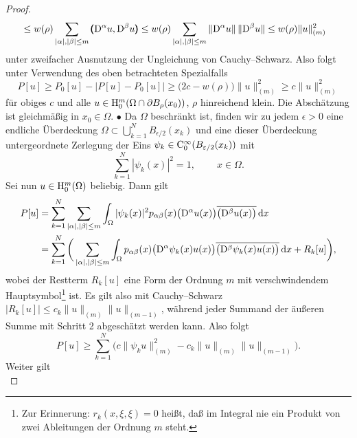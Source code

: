\begin{proof}
\begin{equation}
\begin{split}
	&\le w(\rho) \sum\limits_{|\alpha|,|\beta| \le m} \pmb(\mathrm D^\alpha u,\mathrm D^\beta u\pmb) \le  w(\rho) \sum\limits_{|\alpha|,|\beta| \le m}\|\mathrm D^\alpha u\|\, \|\mathrm D^\beta u\| \le
	 w(\rho) \|u\|_{(m)}^2
\end{split}
\end{equation}
unter zweifacher Ausnutzung der Ungleichung von Cauchy--Schwarz. Also folgt unter Verwendung des oben betrachteten Spezialfalls
\begin{equation}
	P[u] \ge P_0[u] - \big| P[u] - P_0[u] \big| \ge \big( 2c - w(\rho) \big) \|u\|_{(m)}^2 \ge  c \| u\|_{(m)}^2
\end{equation} 
für obiges $c$ und alle $u\in \mathrm H_0^m(\Omega \cap \partial B_\rho(x_0))$,  $\rho$ hinreichend klein. Die Abschätzung ist gleichmäßig in $x_0\in\Omega$.
$\bullet$ Da $\Omega$ beschränkt ist, finden wir zu jedem $\epsilon>0$ eine endliche Überdeckung $\Omega\subset\bigcup_{k=1}^N B_{{\epsilon}/{2}}(x_k)$ und eine dieser Überdeckung untergeordnete Zerlegung der Eins $\psi_k\in\mathrm C_0^\infty(B_{\varepsilon/2}(x_k))$ mit
\begin{equation}
 \sum\limits_{k=1}^N |\psi_k(x)|^2 = 1,\qquad \ x\in \Omega.
\end{equation}
Sei nun $u\in\mathrm H_0^m(\Omega)$ beliebig. Dann gilt
\begin{equation}
\begin{split}
	P[u]&= \sum_{k=1}^N \sum\limits_{|\alpha|,|\beta|\le m} \int_\Omega |\psi_k(x)|^2p_{\alpha\beta}(x)\big(\mathrm D^\alpha u(x)\big)\overline{\big(\mathrm D^\beta u(x)\big)}\,\mathrm d x\\
	&=  \sum_{k=1}^N \bigg( \sum\limits_{|\alpha|,|\beta|\le m} \int_\Omega  p_{\alpha\beta}(x)\big(\mathrm D^\alpha \psi_k(x) u(x)\big)\overline{\big(\mathrm D^\beta \psi_k(x) u(x)\big)}\,\mathrm d x + R_k[u]\bigg),
\end{split}
\end{equation}
wobei der Restterm $R_k[u]$ eine Form der Ordnung $m$ mit verschwindendem Hauptsymbol\footnote{Zur Erinnerung: $r_k(x,\xi,\xi)=0$ heißt, daß im Integral nie ein Produkt von zwei Ableitungen der Ordnung $m$ steht.} ist. Es gilt also mit Cauchy--Schwarz $|R_k[u]|\le c_k \|u\|_{(m)} \|u\|_{(m-1)}$, während jeder Summand der äußeren Summe mit Schritt 2 abgeschätzt werden kann. Also folgt 
\begin{equation}\label{eq:6.16}
P[u] \ge \sum_{k=1}^N  \bigg( c \|\psi_k u\|_{(m)}^2 - c_k \|u\|_{(m)} \|u\|_{(m-1)} \bigg) .
\end{equation}
Weiter gilt 
\begin{equation}

\end{equation}
\end{proof}
